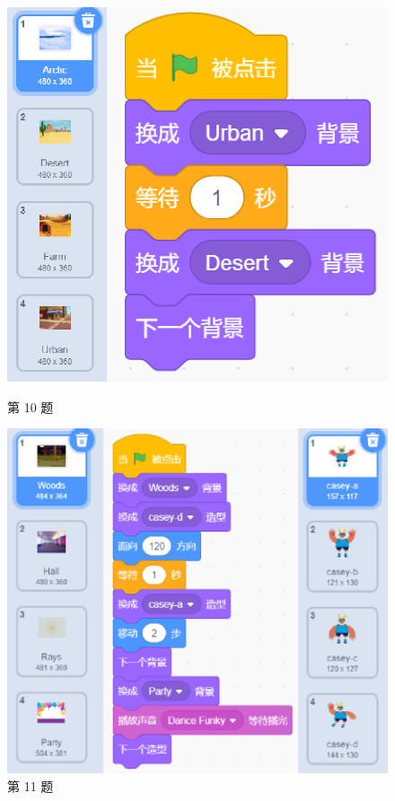 \documentclass[10pt, a4paper]{article}
\begin{document}
\begin{enumerate}
\begin{figure}[htbp]
\begin{minipage}[t]{.3\textwidth}
                \includegraphics[width=\textwidth]{10.png}
                \caption*{第 10 题}
            \end{minipage}
            \begin{minipage}[t]{.33\textwidth}
                \centering
                \includegraphics[width=\textwidth]{11.png}
                \caption*{第 11 题}
            \end{minipage}
        \end{figure}


\end{enumerate}
\end{document}
